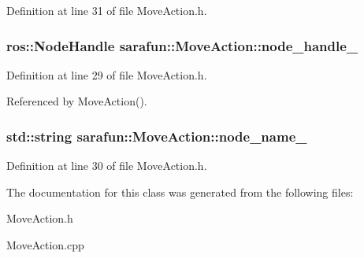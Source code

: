 Definition at line 31 of file Move\-Action.\-h.

\hypertarget{classsarafun_1_1MoveAction_afeeec2d5df7b090e1b32112949478240_afeeec2d5df7b090e1b32112949478240}{
\subsubsection[{node\-\_\-handle\-\_\-}]{\setlength{\rightskip}{0pt plus 5cm}ros\-::\-Node\-Handle sarafun\-::\-Move\-Action\-::node\-\_\-handle\-\_\-\hspace{0.3cm}{\ttfamily [private]}}}\label{classsarafun_1_1MoveAction_afeeec2d5df7b090e1b32112949478240_afeeec2d5df7b090e1b32112949478240}


Definition at line 29 of file Move\-Action.\-h.



Referenced by Move\-Action().

\hypertarget{classsarafun_1_1MoveAction_aee80be9ccc56ec8d9c5565b302a3f6f4_aee80be9ccc56ec8d9c5565b302a3f6f4}{
\subsubsection[{node\-\_\-name\-\_\-}]{\setlength{\rightskip}{0pt plus 5cm}std\-::string sarafun\-::\-Move\-Action\-::node\-\_\-name\-\_\-\hspace{0.3cm}{\ttfamily [private]}}}\label{classsarafun_1_1MoveAction_aee80be9ccc56ec8d9c5565b302a3f6f4_aee80be9ccc56ec8d9c5565b302a3f6f4}


Definition at line 30 of file Move\-Action.\-h.



The documentation for this class was generated from the following files\-:\begin{DoxyCompactItemize}
\item 
Move\-Action.\-h\item 
Move\-Action.\-cpp\end{DoxyCompactItemize}
